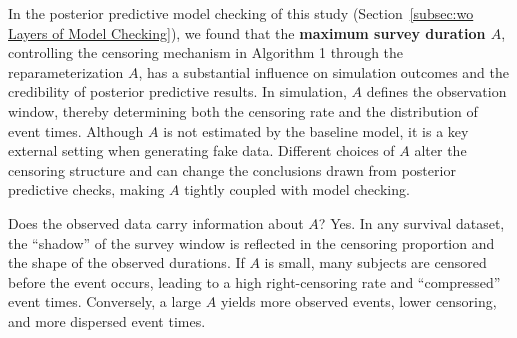 In the posterior predictive model checking of this study (Section~\ref{subsec:wo Layers of Model Checking}), we found that the \textbf{maximum survey duration $A$}, controlling the censoring mechanism in Algorithm 1 through the reparameterization $A$, has a substantial influence on simulation outcomes and the credibility of posterior predictive results. In simulation, $A$ defines the observation window, thereby determining both the censoring rate and the distribution of event times. Although $A$ is not estimated by the baseline model, it is a key external setting when generating fake data. Different choices of $A$ alter the censoring structure and can change the conclusions drawn from posterior predictive checks, making $A$ tightly coupled with model checking.

Does the observed data carry information about $A$? Yes. In any survival dataset, the “shadow” of the survey window is reflected in the censoring proportion and the shape of the observed durations. If $A$ is small, many subjects are censored before the event occurs, leading to a high right-censoring rate and “compressed” event times. Conversely, a large $A$ yields more observed events, lower censoring, and more dispersed event times.

